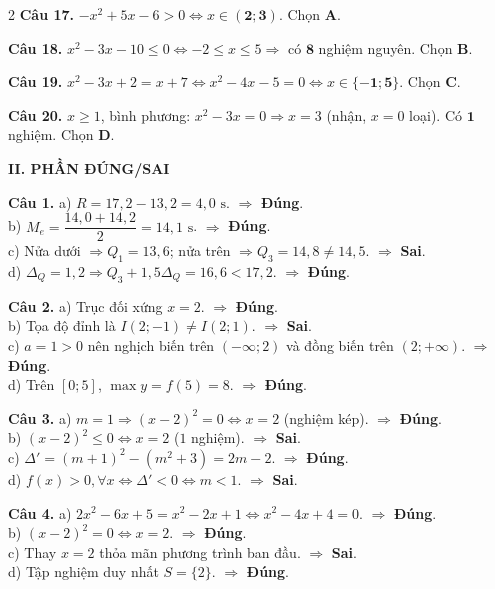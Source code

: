 \documentclass[12pt,a4paper]{article}
\begin{document}
\begin{multicols}{2}
\textbf{Câu 17.} $-x^2 + 5x - 6 > 0 \Leftrightarrow x \in \mathbf{(2; 3)}$. Chọn \textbf{A}.

\textbf{Câu 18.} $x^2 - 3x - 10 \le 0 \Leftrightarrow -2 \le x \le 5 \Rightarrow$ có $\mathbf{8}$ nghiệm nguyên. Chọn \textbf{B}.

\textbf{Câu 19.} $x^2 - 3x + 2 = x + 7 \Leftrightarrow x^2 - 4x - 5 = 0 \Leftrightarrow x \in \mathbf{\{-1; 5\}}$. Chọn \textbf{C}.

\textbf{Câu 20.} $x \ge 1$, bình phương: $x^2 - 3x = 0 \Rightarrow x = 3$ (nhận, $x=0$ loại). Có $\mathbf{1}$ nghiệm. Chọn \textbf{D}.

\vspace{3pt}
\textbf{\color{accent}II. PHẦN ĐÚNG/SAI}

\textbf{Câu 1.}
a) $R = 17{,}2 - 13{,}2 = 4{,}0\text{ s}$. $\Rightarrow$ \textbf{Đúng}.\\
b) $M_e = \dfrac{14{,}0 + 14{,}2}{2} = 14{,}1\text{ s}$. $\Rightarrow$ \textbf{Đúng}.\\
c) Nửa dưới $\Rightarrow Q_1 = 13{,}6$; nửa trên $\Rightarrow Q_3 = 14{,}8 \ne 14{,}5$. $\Rightarrow$ \textbf{Sai}.\\
d) $\Delta_Q = 1{,}2 \Rightarrow Q_3 + 1{,}5\Delta_Q = 16{,}6 < 17{,}2$. $\Rightarrow$ \textbf{Đúng}.

\textbf{Câu 2.}
a) Trục đối xứng $x = 2$. $\Rightarrow$ \textbf{Đúng}.\\
b) Tọa độ đỉnh là $I(2; -1) \ne I(2; 1)$. $\Rightarrow$ \textbf{Sai}.\\
c) $a = 1 > 0$ nên nghịch biến trên $(-\infty; 2)$ và đồng biến trên $(2; +\infty)$. $\Rightarrow$ \textbf{Đúng}.\\
d) Trên $[0; 5]$, $\max y = f(5) = 8$. $\Rightarrow$ \textbf{Đúng}.

\textbf{Câu 3.}
a) $m = 1 \Rightarrow (x - 2)^2 = 0 \Leftrightarrow x = 2$ (nghiệm kép). $\Rightarrow$ \textbf{Đúng}.\\
b) $(x - 2)^2 \le 0 \Leftrightarrow x = 2$ ($1$ nghiệm). $\Rightarrow$ \textbf{Sai}.\\
c) $\Delta' = (m + 1)^2 - (m^2 + 3) = 2m - 2$. $\Rightarrow$ \textbf{Đúng}.\\
d) $f(x) > 0, \forall x \Leftrightarrow \Delta' < 0 \Leftrightarrow m < 1$. $\Rightarrow$ \textbf{Sai}.

\textbf{Câu 4.}
a) $2x^2 - 6x + 5 = x^2 - 2x + 1 \Leftrightarrow x^2 - 4x + 4 = 0$. $\Rightarrow$ \textbf{Đúng}.\\
b) $(x - 2)^2 = 0 \Leftrightarrow x = 2$. $\Rightarrow$ \textbf{Đúng}.\\
c) Thay $x = 2$ thỏa mãn phương trình ban đầu. $\Rightarrow$ \textbf{Sai}.\\
d) Tập nghiệm duy nhất $S = \{2\}$. $\Rightarrow$ \textbf{Đúng}.


\end{multicols}
\end{document}
